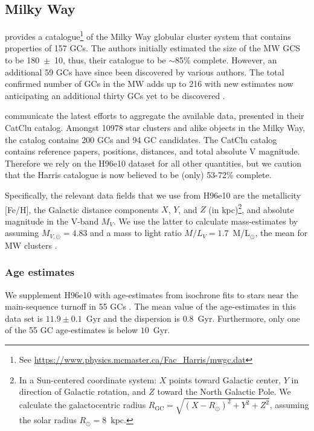 \documentclass[a4paper,fleqn,usenatbib]{mnras}
\begin{document}
\subsection{Milky Way}
\label{sec:milkyway}
\citet[][2010 edition; hereafter H96e10]{1996AJ....112.1487H} provides a
catalogue\footnote{See \url{https://www.physics.mcmaster.ca/Fac_Harris/mwgc.dat}}
of the Milky Way globular cluster system that contains properties of
157 GCs. The authors initially estimated the size of the MW GCS to be 180~$\pm$~10,
thus, their catalogue to be $\sim$85\% complete. However, an additional 59 GCs
have since been discovered by various authors. The total confirmed number of GCs
in the MW adds up to 216 with new estimates now anticipating an additional thirty
GCs yet to be discovered \citep[e.g.][and references therein]{2018ApJ...863L..38R}.

\citet{2019AJ....157...12B} communicate the latest efforts to aggregate the
available data, presented in their CatClu catalog. Amongst 10978 star clusters
and alike objects in the Milky Way, the catalog contains 200 GCs and 94 GC
candidates. The CatClu catalog contains reference papers, positions, distances,
and total absolute V magnitude. Therefore we rely on the H96e10 dataset for all
other quantities, but we caution that the Harris catalogue is now believed to be (only) 53-72\% complete.

Specifically, the relevant data fields that we use from H96e10 are the
metallicity [Fe/H], the Galactic distance components $X$, $Y$, and $Z$ (in
kpc)\footnote{In a Sun-centered coordinate system: $X$ points toward Galactic
center, $Y$ in direction of Galactic rotation, and $Z$ toward the North Galactic
Pole. We calculate the galactocentric radius $R_{\text{GC}}=\sqrt{(X-R_\odot)^2
+ Y^2 + Z^2}$, assuming the solar radius $R_\odot=8$~kpc.}, and absolute
magnitude in the V-band $M_V$. We use the latter to calculate mass-estimates by
assuming $M_{V,\odot}=4.83$ and a mass to light ratio $M/L_V = 1.7$~M/L$_{\odot}$,
the mean for MW clusters \citep{2005ApJS..161..304M}.

\subsubsection{Age estimates}
We supplement H96e10 with age-estimates from isochrone fits to stars
near the main-sequence turnoff in 55 GCs \citep[][hereafter V13]{2013ApJ...775..134V}.
The mean value of the age-estimates in this data set is $11.9 \pm 0.1$~Gyr and
the dispersion is $0.8$~Gyr. Furthermore, only one of the 55 GC age-estimates is
below $10$~Gyr.
\end{document}
